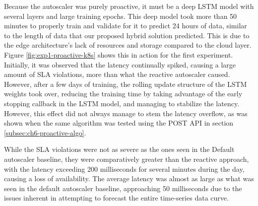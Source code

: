 Because the autoscaler was purely proactive, it must be a deep LSTM model with several layers and large training epochs. This deep model took more than 50 minutes to properly train and validate for it to predict 24 hours of data, similar to the length of data that our proposed hybrid solution predicted. This is due to the edge architecture's lack of resources and storage compared to the cloud layer. Figure \ref{fig:exp1-proactive-k8s} shows this in action for the first experiment. Initially, it was observed that the latency continually spiked, causing a large amount of SLA violations, more than what the reactive autoscaler caused. However, after a few days of training, the rolling update structure of the LSTM weights took over, reducing the training time by taking advantage of the early stopping callback in the LSTM model, and managing to stabilize the latency. However, this effect did not always manage to stem the latency overflow, as was shown when the same algorithm was tested using the POST API in section \ref{subsec:ch6-proactive-algo}.

While the SLA violations were not as severe as the ones seen in the Default autoscaler baseline, they were comparatively greater than the reactive approach, with the latency exceeding 200 milliseconds for several minutes during the day, causing a loss of availability. The average latency was almost as large as what was seen in the default autoscaler baseline, approaching 50 milliseconds due to the issues inherent in attempting to forecast the entire time-series data curve.\par

